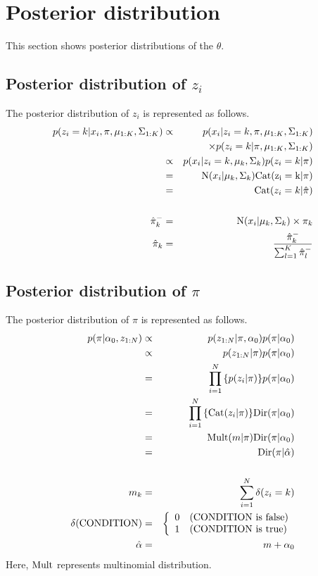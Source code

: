 \documentclass[a4paper]{article}
\begin{document}
\section{Posterior distribution}
This section shows posterior distributions of the $\theta$.

\subsection{Posterior distribution of $z_i$}
The posterior distribution of $z_i$ is represented as follows.
\begin{eqnarray}
	p(z_i = k | x_i, \pi, \mu_{1:K}, \Sigma_{1:K}) &\propto& p(x_i | z_i = k, \pi, \mu_{1:K}, \Sigma_{1:K}) \nonumber \\
	&&~~~\times p(z_i = k | \pi, \mu_{1:K}, \Sigma_{1:K})\\
		&\propto& p(x_i | z_i = k, \mu_k, \Sigma_k) p(z_i = k | \pi)\\
	&=& {\rm N}(x_i | \mu_k, \Sigma_k) {\rm Cat(z_i = k | \pi)}\\
	&=& {\rm Cat}(z_i = k | \hat{\pi})\\
	\nonumber \\
	\hat{\pi}^{-}_{k} &=& {\rm N}(x_i | \mu_k, \Sigma_k) \times \pi_k \\
	\hat{\pi}_k &=& \frac{\hat{\pi}^{-}_k}{\sum_{l = 1}^{K}{\hat{\pi}^{-}_l}}
\end{eqnarray}

\subsection{Posterior distribution of $\pi$}
The posterior distribution of $\pi$ is represented as follows.
\begin{eqnarray}
	p(\pi | \alpha_0, z_{1:N}) &\propto& p(z_{1:N} | \pi, \alpha_0) p(\pi | \alpha_0)\\
	&\propto& p(z_{1:N} | \pi) p(\pi | \alpha_0)\\
	&=& \prod_{i=1}^{N}{\left\{ p(z_i | \pi) \right\} } p(\pi | \alpha_0)\\
	&=& \prod_{i=1}^{N}{\left\{ {\rm Cat}(z_i | \pi) \right\} } {\rm Dir}(\pi | \alpha_0)\\
	&=& {\rm Mult}(m | \pi) {\rm Dir}(\pi | \alpha_0)\\
	&=& {\rm Dir}(\pi | \hat{\alpha})\\
	\nonumber \\
	m_k &=& \sum_{i=1}^{N}{\delta(z_i = k)}\\
	\delta(\text{CONDITION}) &=&
	\left\{
	\begin{array}{ll}
		0 & (\text{CONDITION is false})\\
		1 & (\text{CONDITION is true})
	\end{array}
	\right.\\
	\hat{\alpha} &=& m + \alpha_0
\end{eqnarray}
Here, ${\rm Mult}$ represents multinomial distribution.
\end{document}
